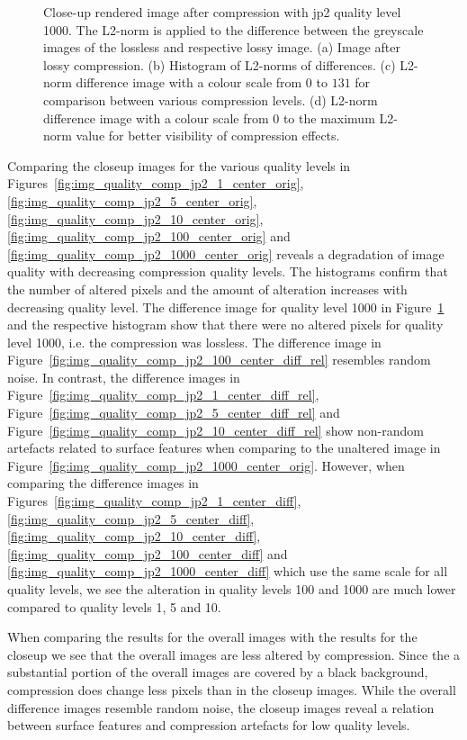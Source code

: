 \begin{figure}[htb]
\begin{subfigure}[b]{0.48\textwidth}
        \caption{}
        \label{fig:img_quality_comp_jp2_1000_center_diff_rel}
    \end{subfigure}
    \caption{Close-up rendered image after compression with \gls{jp2} quality level 1000. The L2-norm is applied to the difference between the greyscale images of the lossless and respective lossy image. (a) Image after lossy compression. (b) Histogram of L2-norms of differences. (c) L2-norm difference image with a colour scale from $0$ to $131$ for comparison between various compression levels. (d) L2-norm difference image with a colour scale from $0$ to the maximum L2-norm value for better visibility of compression effects.}
    \label{fig:img_quality_comp_jp2_1000_center}
\end{figure}

Comparing the closeup images for the various quality levels in Figures~\ref{fig:img_quality_comp_jp2_1_center_orig}, \ref{fig:img_quality_comp_jp2_5_center_orig}, \ref{fig:img_quality_comp_jp2_10_center_orig}, \ref{fig:img_quality_comp_jp2_100_center_orig} and \ref{fig:img_quality_comp_jp2_1000_center_orig} reveals a degradation of image quality with decreasing compression quality levels. The histograms confirm that the number of altered pixels and the amount of alteration increases with decreasing quality level. The difference image for quality level 1000 in Figure~\ref{fig:img_quality_comp_jp2_1000_center_diff_rel} and the respective histogram show that there were no altered pixels for quality level 1000, i.e. the compression was lossless. The difference image in Figure~\ref{fig:img_quality_comp_jp2_100_center_diff_rel} resembles random noise. In contrast, the difference images in Figure~\ref{fig:img_quality_comp_jp2_1_center_diff_rel}, Figure~\ref{fig:img_quality_comp_jp2_5_center_diff_rel} and Figure~\ref{fig:img_quality_comp_jp2_10_center_diff_rel} show non-random artefacts related to surface features when comparing to the unaltered image in Figure~\ref{fig:img_quality_comp_jp2_1000_center_orig}. However, when comparing the difference images in Figures~\ref{fig:img_quality_comp_jp2_1_center_diff}, \ref{fig:img_quality_comp_jp2_5_center_diff}, \ref{fig:img_quality_comp_jp2_10_center_diff}, \ref{fig:img_quality_comp_jp2_100_center_diff} and \ref{fig:img_quality_comp_jp2_1000_center_diff} which use the same scale for all quality levels, we see the alteration in quality levels \SI{100}{} and \SI{1000}{} are much lower compared to quality levels \SI{1}{}, \SI{5}{} and \SI{10}{}.

When comparing the results for the overall images with the results for the closeup we see that the overall images are less altered by compression. Since the a substantial portion of the  overall images are covered by a black background, compression does change less pixels than in the closeup images. While the overall difference images resemble random noise, the closeup images reveal a relation between surface features and compression artefacts for low quality levels.

